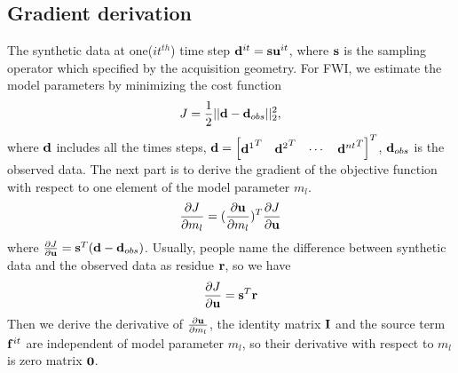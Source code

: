 \documentclass[revised,endfloat]{geophysics}
\begin{document}
\subsection{Gradient derivation}
The synthetic data at one($it^{th}$) time step ${\bf d}^{it}= {\bf s} {\bf u}^{it}$, where ${\bf s}$ is the sampling operator which specified by the acquisition geometry. For FWI, we estimate the model parameters by minimizing the cost function
\begin{equation}
J = \frac{1}{2}|| {\bf d} - {\bf d}_{obs}||_2^2,
\label{eq51}
\end{equation}
where ${\bf d}$ includes all the times steps, ${\bf d} = \begin{bmatrix}
{{\bf d}^1}^T & {{\bf d}^2}^T & \cdots & {{\bf d}^{nt}}^T
\end{bmatrix}^T$, ${\bf d}_{obs}$ is the observed data.
The next part is to derive the gradient of the objective function with respect to one element of the model parameter $m_l$.
\begin{equation}
\frac{\partial J}{\partial {m}_l} = (\frac{\partial {\bf u}}{\partial m_l})^T \frac{\partial J}{\partial {\bf u}}
\label{eq52}
\end{equation}
where $\frac{\partial J}{\partial {\bf u}} = {\bf s}^T ({\bf d} - {\bf d}_{obs})$. Usually, people name the difference between synthetic data and the observed data as residue ${\bf r}$, so we have 
\begin{equation}
\frac{\partial J}{\partial {\bf u}} = {\bf s}^T {\bf r}
\label{eq53}
\end{equation}
Then we derive the derivative of $\frac{\partial {\bf u}}{\partial m_l}$, the identity matrix ${\bf I}$ and the source term ${\bf f}^{it}$ are independent of model parameter $m_l$, so their derivative with respect to $m_l$ is zero matrix ${\bf 0}$.
\end{document}
